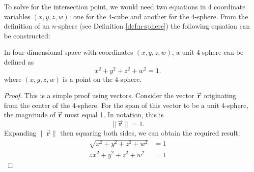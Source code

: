 To solve for the intersection point, we would need two equations in 4 coordinate variables $(x, y, z, w)$: one for the 4-cube and another for the 4-sphere. From the definition of an $n$-sphere (see Definition \ref{def:n-sphere}) the following equation can be constructed:
\begin{lemma} %
In four-dimensional space with coordinates $(x, y, z, w)$, a unit 4-sphere can be defined as
\begin{equation}\label{eq:unit 4-sphere}
    x^2+y^2+z^2+w^2=1.
\end{equation}
where $(x, y, z, w)$ is a point on the 4-sphere.
\end{lemma}
\begin{proof}
    This is a simple proof using vectors. Consider the vector $\Vec{\mathbf{r}}$ originating from the center of the 4-sphere. For the span of this vector to be a unit 4-sphere, the magnitude of $\Vec{\mathbf{r}}$ must equal 1. In notation, this is $$\lVert\Vec{\mathbf{r}}\rVert = 1.$$
    Expanding $\lVert\Vec{\mathbf{r}}\rVert$ then squaring both sides, we can obtain the required result:
    \begin{align*}
        \sqrt{x^2+y^2+z^2+w^2}&=1\\
        \therefore x^2+y^2+z^2+w^2&=1
    \end{align*}
\end{proof}

